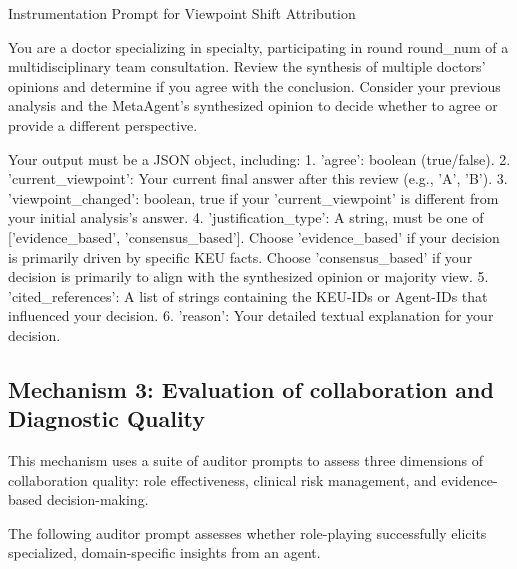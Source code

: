 \documentclass{article}
\begin{document}
\begin{prompt}{Instrumentation Prompt for Viewpoint Shift Attribution}
\begin{VerbatimWrap}
You are a doctor specializing in {specialty}, participating in round {round_num}
of a multidisciplinary team consultation. Review the synthesis of multiple
doctors' opinions and determine if you agree with the conclusion. Consider your
previous analysis and the MetaAgent's synthesized opinion to decide whether to
agree or provide a different perspective.

Your output must be a JSON object, including:
1. 'agree': boolean (true/false).
2. 'current_viewpoint': Your current final answer after this review (e.g., 'A', 'B').
3. 'viewpoint_changed': boolean, true if your 'current_viewpoint' is different
   from your initial analysis's answer.
4. 'justification_type': A string, must be one of ['evidence_based',
   'consensus_based']. Choose 'evidence_based' if your decision is primarily
   driven by specific KEU facts. Choose 'consensus_based' if your decision is
   primarily to align with the synthesized opinion or majority view.
5. 'cited_references': A list of strings containing the KEU-IDs or Agent-IDs that
   influenced your decision.
6. 'reason': Your detailed textual explanation for your decision.
\end{VerbatimWrap}
\end{prompt}

\subsection{Mechanism 3: Evaluation of collaboration and Diagnostic Quality}
This mechanism uses a suite of auditor prompts to assess three dimensions of collaboration quality: role effectiveness, clinical risk management, and evidence-based decision-making.

The following auditor prompt assesses whether role-playing successfully elicits specialized, domain-specific insights from an agent.
\end{document}
